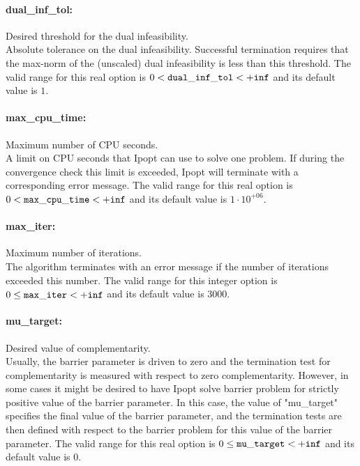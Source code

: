 \paragraph{dual\_inf\_tol:}\label{sec:dual_inf_tol} Desired threshold for the dual infeasibility. $\;$ \\
 Absolute tolerance on the dual infeasibility.
Successful termination requires that the max-norm
of the (unscaled) dual infeasibility is less than
this threshold. The valid range for this real option is 
$0 <  {\tt dual\_inf\_tol } <  {\tt +inf}$
and its default value is $1$.


\paragraph{max\_cpu\_time:}\label{sec:max_cpu_time} Maximum number of CPU seconds. $\;$ \\
 A limit on CPU seconds that Ipopt can use to
solve one problem.  If during the convergence
check this limit is exceeded, Ipopt will
terminate with a corresponding error message. The valid range for this real option is 
$0 <  {\tt max\_cpu\_time } <  {\tt +inf}$
and its default value is $1 \cdot 10^{+06}$.


\paragraph{max\_iter:}\label{sec:max_iter} Maximum number of iterations. $\;$ \\
 The algorithm terminates with an error message if
the number of iterations exceeded this number. The valid range for this integer option is
$0 \le {\tt max\_iter } <  {\tt +inf}$
and its default value is $3000$.


\paragraph{mu\_target:}\label{sec:mu_target} Desired value of complementarity. $\;$ \\
 Usually, the barrier parameter is driven to zero
and the termination test for complementarity is
measured with respect to zero complementarity. 
However, in some cases it might be desired to
have Ipopt solve barrier problem for strictly
positive value of the barrier parameter.  In this
case, the value of "mu\_target" specifies the
final value of the barrier parameter, and the
termination tests are then defined with respect
to the barrier problem for this value of the
barrier parameter. The valid range for this real option is 
$0 \le {\tt mu\_target } <  {\tt +inf}$
and its default value is $0$.


